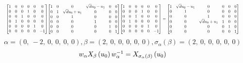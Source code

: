 \documentclass[11pt]{article}
\theoremstyle{definition}
\begin{document}
\[
\scaletoalign{\textwidth}{{\left[\begin{matrix}1 & 0 & 0 & 0 & 0 & 0\\0 & 0 & 0 & 1 & 0 & 0\\0 & 0 & 1 & 0 & 0 & 0\\0 & 1 & 0 & 0 & 0 & 0\\0 & 0 & 0 & 0 & 1 & 0\\0 & 0 & 0 & 0 & 0 & -1\end{matrix}\right]} {\left[\begin{matrix}1 & 0 & 0 & \sqrt{d} u_{0} - u_{1} & 0 & 0\\0 & 1 & \sqrt{d} u_{0} + u_{1} & 0 & 0 & 0\\0 & 0 & 1 & 0 & 0 & 0\\0 & 0 & 0 & 1 & 0 & 0\\0 & 0 & 0 & 0 & 1 & 0\\0 & 0 & 0 & 0 & 0 & 1\end{matrix}\right]} {\left[\begin{matrix}1 & 0 & 0 & 0 & 0 & 0\\0 & 0 & 0 & 1 & 0 & 0\\0 & 0 & 1 & 0 & 0 & 0\\0 & 1 & 0 & 0 & 0 & 0\\0 & 0 & 0 & 0 & 1 & 0\\0 & 0 & 0 & 0 & 0 & -1\end{matrix}\right]} = {\left[\begin{matrix}1 & \sqrt{d} u_{0} - u_{1} & 0 & 0 & 0 & 0\\0 & 1 & 0 & 0 & 0 & 0\\0 & 0 & 1 & 0 & 0 & 0\\0 & 0 & \sqrt{d} u_{0} + u_{1} & 1 & 0 & 0\\0 & 0 & 0 & 0 & 1 & 0\\0 & 0 & 0 & 0 & 0 & 1\end{matrix}\right]}}
\]
\[
\alpha = \left( 0, \  -2, \  0, \  0, \  0, \  0\right), \beta = \left( 2, \  0, \  0, \  0, \  0, \  0\right), \sigma_{\alpha}(\beta) = \left( 2, \  0, \  0, \  0, \  0, \  0\right)
\]
\[
\scaletoalign{\textwidth}{w_{\alpha} X_{\beta}\left(u_{0}\right) w_{\alpha}^{-1} = X_{\sigma_{\alpha}\left(\beta\right)}\left(u_{0}\right)}
\]
\end{document}
